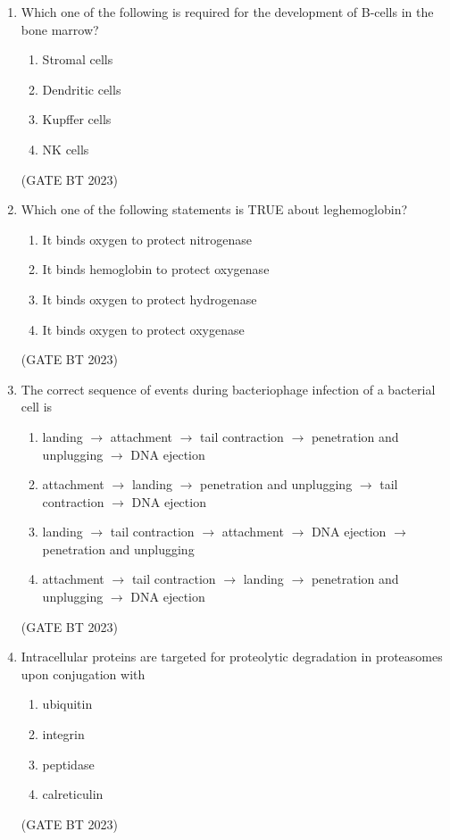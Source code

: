 \documentclass[journal,12pt,onecolumn]{IEEEtran}
\begin{document}
\begin{enumerate}
    \item Which one of the following is required for the development of B-cells in the bone marrow?
    \begin{enumerate}
        \item Stromal cells
        \item Dendritic cells
        \item Kupffer cells
        \item NK cells
    \end{enumerate}
    \hfill(GATE BT 2023)

    \item Which one of the following statements is TRUE about leghemoglobin?
    \begin{enumerate}
        \item It binds oxygen to protect nitrogenase
        \item It binds hemoglobin to protect oxygenase
        \item It binds oxygen to protect hydrogenase
        \item It binds oxygen to protect oxygenase
    \end{enumerate}
    \hfill(GATE BT 2023)

    \item The correct sequence of events during bacteriophage infection of a bacterial cell is
    \begin{enumerate}
        \item landing $\rightarrow$ attachment $\rightarrow$ tail contraction $\rightarrow$ penetration and unplugging $\rightarrow$ DNA ejection
        \item attachment $\rightarrow$ landing $\rightarrow$ penetration and unplugging $\rightarrow$ tail contraction $\rightarrow$ DNA ejection
        \item landing $\rightarrow$ tail contraction $\rightarrow$ attachment $\rightarrow$ DNA ejection $\rightarrow$ penetration and unplugging
        \item attachment $\rightarrow$ tail contraction $\rightarrow$ landing $\rightarrow$ penetration and unplugging $\rightarrow$ DNA ejection
    \end{enumerate}
    \hfill(GATE BT 2023)

    \item Intracellular proteins are targeted for proteolytic degradation in proteasomes upon conjugation with
    \begin{enumerate}
        \item ubiquitin
        \item integrin
        \item peptidase
        \item calreticulin
    \end{enumerate}
    \hfill(GATE BT 2023)


\end{enumerate}
\end{document}
